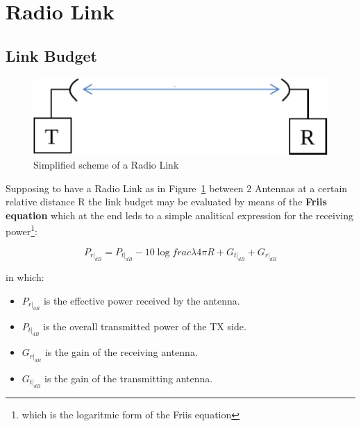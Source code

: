 





\section{Radio Link} %
\label{sec:radio_link}


\subsection{Link Budget} %
\label{sub:link_budget}

\begin{figure}[h]
	\centering
	\includegraphics[scale=0.6]{Immagini/link}
	
	\caption{Simplified scheme of a Radio Link}
	\label{fig:link}
\end{figure}

Supposing to have a Radio Link as in Figure~\ref{fig:link} between 2 Antennas at a certain relative distance R the link budget may be evaluated by means of the \textbf{Friis equation} which at the end leds to a simple analitical expression for the receiving power\footnote{which is the logaritmic form of the Friis equation}:

\begin{equation}	
P_{r|_{dB}} = P_{t|_{dB}} - 10 \log{frac{\lambda}{4\pi R}} + G_{t|_{dB}} + G_{r|_{dB}} 
\end{equation}

in which:

\begin{itemize}
	\item $P_{r|_{dB}}$ is the effective power received by the antenna.
	\item $P_{t|_{dB}}$ is the overall transmitted power of the TX side.
	\item $G_{r|_{dB}}$ is the gain of the receiving antenna.
	\item $G_{t|_{dB}}$ is the gain of the transmitting antenna.
\end{itemize}

